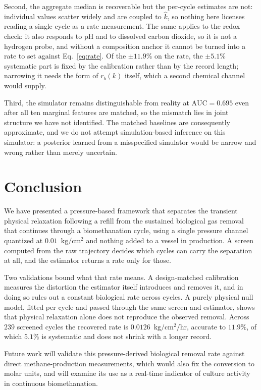 \documentclass[runningheads]{llncs}
\newcommand{\pu}{\ensuremath{\mathrm{kg/cm^{2}}}}
\newcommand{\ratu}{\ensuremath{\mathrm{kg/cm^{2}/hr}}}
\newcommand{\rb}{\ensuremath{r_{b}}}
\newcommand{\kh}{\ensuremath{\hat{k}}}
\begin{document}
Second, the aggregate median is recoverable but the per-cycle estimates
are not: individual values scatter widely and are coupled to \kh{}, so
nothing here licenses reading a single cycle as a rate measurement. The
same applies to the redox check: it also responds to pH and to
dissolved carbon dioxide, so it is not a hydrogen probe, and without a
composition anchor it cannot be turned into a rate to set against
Eq.~\eqref{eq:rate}. Of the $\pm 11.9\%$ on the rate, the $\pm 5.1\%$
systematic part is fixed by the calibration rather than by the record
length; narrowing it needs the form of $\rb(k)$ itself, which a second
chemical channel would supply.

Third, the simulator remains distinguishable from reality at
$\mathrm{AUC}=0.695$ even after all ten marginal features are matched,
so the mismatch lies in joint structure we have not identified. The
matched baselines are consequently approximate, and we do not attempt
simulation-based inference on this simulator: a posterior learned from
a misspecified simulator would be narrow and wrong rather than merely
uncertain.

\section{Conclusion}

We have presented a pressure-based framework that separates the
transient physical relaxation following a refill from the sustained
biological gas removal that continues through a biomethanation cycle,
using a single pressure channel quantized at $0.01$~\pu{} and nothing
added to a vessel in production. A screen computed from the raw
trajectory decides which cycles can carry the separation at all, and
the estimator returns a rate only for those.

Two validations bound what that rate means. A design-matched
calibration measures the distortion the estimator itself introduces and
removes it, and in doing so rules out a constant biological rate across
cycles. A purely physical null model, fitted per cycle and passed
through the same screen and estimator, shows that physical relaxation
alone does not reproduce the observed removal. Across $239$ screened
cycles the recovered rate is $0.0126$~\ratu{}, accurate to $11.9\%$, of
which $5.1\%$ is systematic and does not shrink with a longer record.

Future work will validate this pressure-derived biological removal rate
against direct methane-production measurements, which would also fix
the conversion to molar units, and will examine its use as a real-time
indicator of culture activity in continuous biomethanation.
\end{document}
